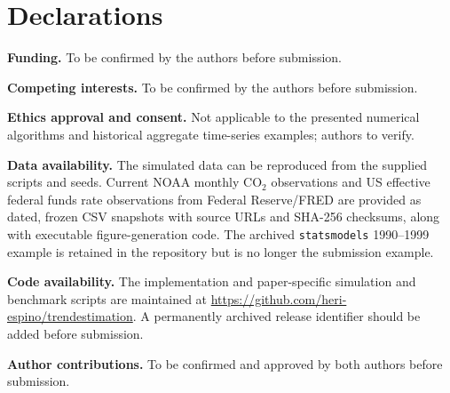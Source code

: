 \documentclass[pdflatex,sn-mathphys-ay]{sn-jnl}
\begin{document}
\section*{Declarations}
\noindent\textbf{Funding.} To be confirmed by the authors before submission.

\noindent\textbf{Competing interests.} To be confirmed by the authors before submission.

\noindent\textbf{Ethics approval and consent.} Not applicable to the presented numerical algorithms and historical aggregate time-series examples; authors to verify.

\noindent\textbf{Data availability.} The simulated data can be reproduced from the supplied scripts and seeds. Current NOAA monthly CO$_2$ observations and US effective federal funds rate observations from Federal Reserve/FRED are provided as dated, frozen CSV snapshots with source URLs and SHA-256 checksums, along with executable figure-generation code. The archived \texttt{statsmodels} 1990--1999 example is retained in the repository but is no longer the submission example.

\noindent\textbf{Code availability.} The implementation and paper-specific simulation and benchmark scripts are maintained at \url{https://github.com/heri-espino/trendestimation}. A permanently archived release identifier should be added before submission.

\noindent\textbf{Author contributions.} To be confirmed and approved by both authors before submission.


\end{document}
